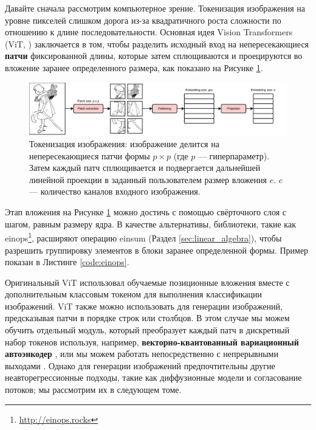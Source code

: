 Давайте сначала рассмотрим компьютерное зрение. Токенизация изображения на уровне пикселей слишком дорога из-за квадратичного роста сложности по отношению к длине последовательности. Основная идея Vision Transformers (ViT, \cite{dosovitskiy2020image}) заключается в том, чтобы разделить исходный вход на непересекающиеся \textbf{патчи} фиксированной длины, которые затем сплющиваются и проецируются во вложение заранее определенного размера, как показано на Рисунке \ref{fig:image_tokenization}.

\begin{figure}[t]
    \centering
    \includegraphics[width=1.0\textwidth]{images/image_tokenization}
    \caption{Токенизация изображения: изображение делится на непересекающиеся патчи формы $p \times p$ (где $p$ — гиперпараметр). Затем каждый патч сплющивается и подвергается дальнейшей линейной проекции в заданный пользователем размер вложения $e$. $c$ — количество каналов входного изображения.}
    \label{fig:image_tokenization}
\end{figure}

Этап вложения на Рисунке \ref{fig:image_tokenization} можно достичь с помощью свёрточного слоя с шагом, равным размеру ядра. В качестве альтернативы, библиотеки, такие как einops\footnote{\url{http://einops.rocks}}, расширяют операцию einsum (Раздел \ref{sec:linear_algebra}), чтобы разрешить группировку элементов в блоки заранее определенной формы. Пример показан в Листинге \ref{code:einops}.

Оригинальный ViT использовал обучаемые позиционные вложения вместе с дополнительным классовым токеном для выполнения классификации изображений. ViT также можно использовать для генерации изображений, предсказывая патчи в порядке строк или столбцов. В этом случае мы можем обучить отдельный модуль, который преобразует каждый патч в дискретный набор токенов используя, например, \textbf{векторно-квантованный вариационный автоэнкодер} \cite{chang2022maskgit}, или мы можем работать непосредственно с непрерывными выходами \cite{tschannen2023givt}. Однако для генерации изображений предпочтительны другие неавторегрессионные подходы, такие как диффузионные модели и согласование потоков; мы рассмотрим их в следующем томе.


